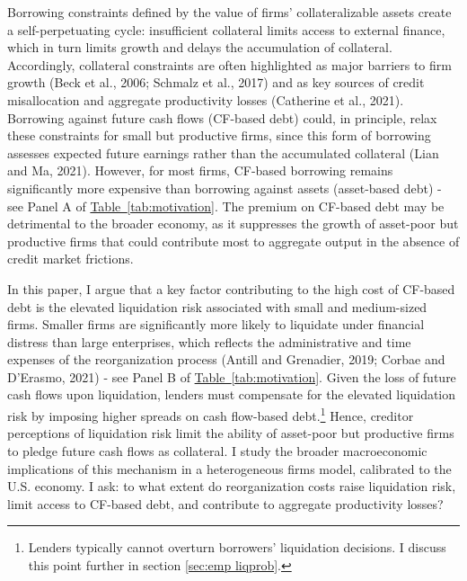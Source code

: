 \documentclass[12pt]{article}
\begin{document}
Borrowing constraints defined by the value of firms' collateralizable assets create a self-perpetuating cycle: insufficient collateral limits access to external finance, which in turn limits growth and delays the accumulation of collateral. Accordingly, collateral constraints are often highlighted as major barriers to firm growth (Beck et al., 2006; Schmalz et al., 2017) and as key sources of credit misallocation and aggregate productivity losses (Catherine et al., 2021). Borrowing against future cash flows (CF-based debt) could, in principle, relax these constraints for small but productive firms, since this form of borrowing assesses expected future earnings rather than the accumulated collateral (Lian and  Ma, 2021). However, for most firms, CF-based borrowing remains significantly more expensive than borrowing against assets (asset-based debt) - see Panel A of \hyperref[tab:motivation]{{Table~\ref*{tab:motivation}}}. The premium on CF-based debt may be detrimental to the broader economy, as it suppresses the growth of asset-poor but productive firms that could contribute most to aggregate output in the absence of credit market frictions.

In this paper, I argue that a key factor contributing to the high cost of CF-based debt is the elevated liquidation risk associated with small and medium-sized firms. Smaller firms are significantly more likely to liquidate under financial distress than large enterprises, which reflects the administrative and time expenses of the reorganization process (Antill and Grenadier, 2019; Corbae and D'Erasmo, 2021) - see Panel B of \hyperref[tab:motivation]{{Table~\ref*{tab:motivation}}}. Given the loss of future cash flows upon liquidation, lenders must compensate for the elevated liquidation risk by imposing higher spreads on cash flow-based debt.\footnote{Lenders typically cannot overturn borrowers' liquidation decisions. I discuss this point further in section \ref{sec:emp liqprob}.} Hence, creditor perceptions of liquidation risk limit the ability of asset-poor but productive firms to pledge future cash flows as collateral. I study the broader macroeconomic implications of this mechanism in a heterogeneous firms model, calibrated to the U.S. economy. I ask: to what extent do reorganization costs raise liquidation risk, limit access to CF-based debt, and contribute to aggregate productivity losses?
\end{document}
